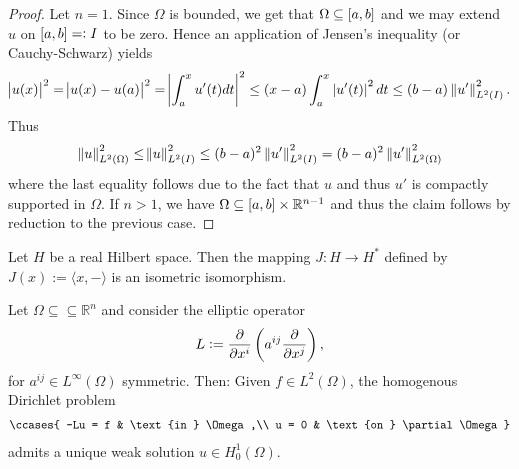 \begin{proof}
	Let $n = 1$. Since $\Omega$ is bounded, we get that $\Omega \subseteq \intcc{a,b}$ and we may extend $u$ on $\intcc{a,b} =: I$ to be zero. Hence an application of Jensen's inequality (or Cauchy-Schwarz) yields
	\begin{equation*}
		\abs{u(x)}^2 = \abs{u(x) - u(a)}^2 = \abs[3]{\int_a^x u'(t)dt}^2 \leq (x - a) \int_a^x \abs[0]{u'(t)}^2dt \leq (b - a) \norm[0]{u'}_{L^2(I)}^2.
	\end{equation*}
	Thus
	\begin{equation*}
		\norm[0]{u}_{L^2(\Omega)}^2 \leq \norm{u}_{L^2(I)}^2 \leq (b - a)^2 \norm[0]{u'}^2_{L^2(I)} = (b - a)^2 \norm[0]{u'}_{L^2(\Omega)}^2
	\end{equation*}
	\noindent where the last equality follows due to the fact that $u$ and thus $u'$ is compactly supported in $\Omega$. If $n > 1$, we have $\Omega \subseteq \intcc{a,b} \times \mathbb{R}^{n-1}$ and thus the claim follows by reduction to the previous case.
\end{proof}

\begin{theorem}
	\label{thm:RRT}
	Let $H$ be a real Hilbert space. Then the mapping $J : H \to H^*$ defined by $J(x) := \langle x,-\rangle$ is an isometric isomorphism.
\end{theorem}

\begin{theorem}
	Let $\Omega \subseteq\subseteq \mathbb{R}^n$ and consider the elliptic operator
	\begin{equation*}
		L := \frac{\partial}{\partial x^i}\del[3]{a^{ij}\frac{\partial}{\partial x^j}},
	\end{equation*}
	\noindent for $a^{ij} \in L^\infty(\Omega)$ symmetric. Then: Given $f \in L^2(\Omega)$, the homogenous Dirichlet problem
	\begin{align}
		\label{eq:HDP}
		\ccases{
			-Lu = f & \text{in } \Omega,\\
			u = 0 & \text{on } \partial\Omega
		}
	\end{align}
	\noindent admits a unique weak solution $u \in H^1_0(\Omega)$.
\end{theorem}

